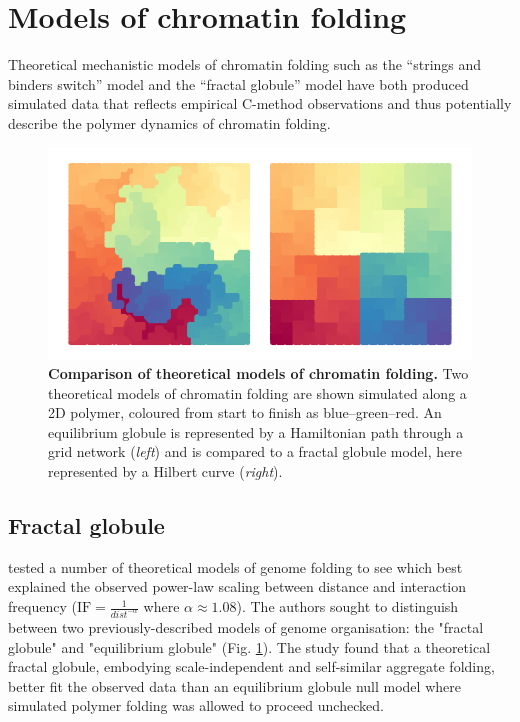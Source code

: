 \documentclass[a4paper,11pt,oneside]{book}
\begin{document}
\section{Models of chromatin folding}

Theoretical mechanistic models of chromatin folding such as the
``strings and binders switch'' model\cite{Barbieri2012} and the ``fractal
globule'' model\cite{Lieberman2009, Mirny2011, Grosberg1988a} have both produced simulated data
that reflects empirical C-method observations and thus potentially describe the polymer
dynamics of chromatin folding.

\begin{figure}
\begin{center}
\includegraphics[width=5.5in]{figs/fractals.pdf}
\captionsetup{width=\textwidth}
\caption[ Comparison of theoretical models of chromatin folding. ]{ {\bf Comparison of theoretical models of chromatin folding. } 
 Two theoretical models of chromatin folding are shown simulated along a 2D polymer, coloured from start to finish as blue--green--red. An equilibrium globule is represented by a Hamiltonian path through a grid network (\emph{left}) and is compared to a fractal globule model, here represented by a Hilbert curve (\emph{right}).
}\label{fig:fractals}
\end{center}
\end{figure} 

\subsection{Fractal globule}
\citet{Lieberman2009} tested a number of theoretical models of genome folding to see which best explained the observed power-law scaling between distance and interaction frequency ($\textrm{IF} =  \frac{1}{dist^{-\alpha}}$ where $\alpha \approx 1.08$).  The authors sought to distinguish between two previously-described models of genome organisation: the "fractal globule" and "equilibrium globule" (Fig. \ref{fig:fractals}). The study found that a theoretical fractal globule, embodying scale-independent and self-similar aggregate folding, better fit the observed data than an equilibrium globule null model where simulated polymer folding was allowed to proceed unchecked.
\end{document}
